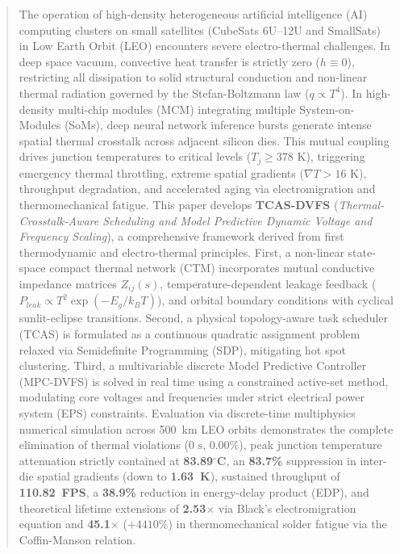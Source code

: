 \documentclass[journal]{IEEEtran}
\begin{document}
\begin{abstract}
The operation of high-density heterogeneous artificial intelligence (AI) computing clusters on small satellites (CubeSats 6U--12U and SmallSats) in Low Earth Orbit (LEO) encounters severe electro-thermal challenges. In deep space vacuum, convective heat transfer is strictly zero ($h \equiv 0$), restricting all dissipation to solid structural conduction and non-linear thermal radiation governed by the Stefan-Boltzmann law ($q \propto T^4$). In high-density multi-chip modules (MCM) integrating multiple System-on-Modules (SoMs), deep neural network inference bursts generate intense spatial thermal crosstalk across adjacent silicon dies. This mutual coupling drives junction temperatures to critical levels ($T_j \ge 378\text{ K}$), triggering emergency thermal throttling, extreme spatial gradients ($\nabla T > 16\text{ K}$), throughput degradation, and accelerated aging via electromigration and thermomechanical fatigue. This paper develops \textbf{TCAS-DVFS} (\textit{Thermal-Crosstalk-Aware Scheduling and Model Predictive Dynamic Voltage and Frequency Scaling}), a comprehensive framework derived from first thermodynamic and electro-thermal principles. First, a non-linear state-space compact thermal network (CTM) incorporates mutual conductive impedance matrices $Z_{ij}(s)$, temperature-dependent leakage feedback ($P_{leak} \propto T^2 \exp(-E_g/k_B T)$), and orbital boundary conditions with cyclical sunlit-eclipse transitions. Second, a physical topology-aware task scheduler (TCAS) is formulated as a continuous quadratic assignment problem relaxed via Semidefinite Programming (SDP), mitigating hot spot clustering. Third, a multivariable discrete Model Predictive Controller (MPC-DVFS) is solved in real time using a constrained active-set method, modulating core voltages and frequencies under strict electrical power system (EPS) constraints. Evaluation via discrete-time multiphysics numerical simulation across 500~km LEO orbits demonstrates the complete elimination of thermal violations ($0\text{ s}$, $0.00\%$), peak junction temperature attenuation strictly contained at \textbf{83.89$^\circ$C}, an \textbf{83.7\%} suppression in inter-die spatial gradients (down to \textbf{1.63~K}), sustained throughput of \textbf{110.82~FPS}, a \textbf{38.9\%} reduction in energy-delay product (EDP), and theoretical lifetime extensions of \textbf{2.53$\times$} via Black's electromigration equation and \textbf{45.1$\times$} ($+4410\%$) in thermomechanical solder fatigue via the Coffin-Manson relation.
\end{abstract}
\end{document}
